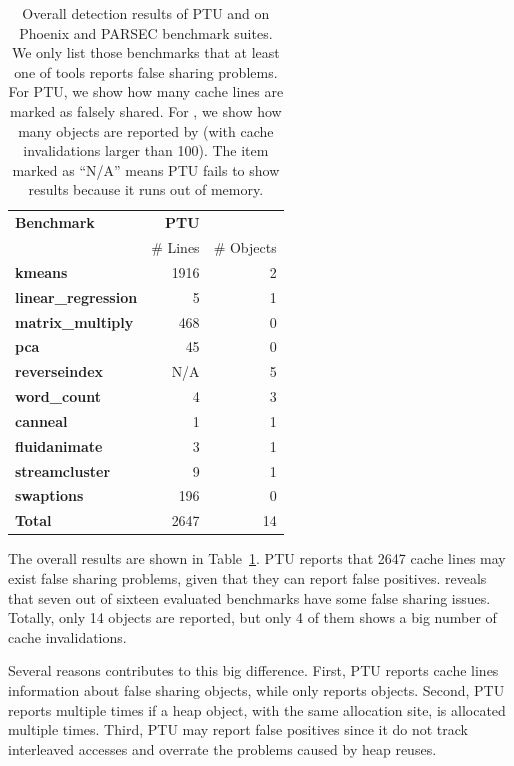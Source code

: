 \begin{table}
\centering
\begin{tabular}{l|r|r}
\hline
{\bf \small Benchmark} & {\bf \small PTU} & {\bf \small \sheriffdetect{}}\\
 & {\# Lines} & {\# Objects}\\
\hline
\small \textbf{kmeans} & 1916 &  2 \\
\small \textbf{linear\_regression} & 5 & 1 \\
\small \textbf{matrix\_multiply} & 468 & 0\\
\small \textbf{pca} & 45 & 0 \\
\small \textbf{reverseindex} & N/A & 5 \\
\small \textbf{word\_count} & 4 & 3\\
\hline
\small \textbf{canneal} & 1 & 1 \\
\small \textbf{fluidanimate} & 3 & 1 \\
\small \textbf{streamcluster} & 9 & 1\\
\small \textbf{swaptions} & 196 & 0\\
\hline
\small \textbf{Total} & 2647 & 14\\
\hline
\end{tabular}
\caption{Overall detection results of PTU and \sheriffdetect{} on Phoenix and PARSEC benchmark suites. We only list those benchmarks that at least one of tools reports false sharing problems. For PTU, we show how many cache lines are marked as falsely shared. For \sheriffdetect{}, we show how many objects are reported by \sheriffdetect{} (with cache invalidations larger than 100). The item marked as ``N/A'' means PTU fails to show results because it runs out of memory.
\label{table:fsdetection}}
\end{table}


The overall results are shown in Table~\ref{table:fsdetection}. PTU reports that 2647 cache lines may exist false sharing problems, given that they can report false positives. \sheriffdetect{} reveals that seven out of sixteen evaluated benchmarks have some false sharing issues. Totally, only 14 objects are reported, but only 4 of them shows a big number of cache invalidations. 

Several reasons contributes to this big difference. First, PTU reports cache lines information about false sharing objects, while \SheriffDetect{} only reports objects. Second, PTU reports multiple times if a heap object, with the same allocation site, is allocated multiple times. 
Third, PTU may report false positives since it do not track interleaved accesses and overrate the problems caused by heap reuses. 


